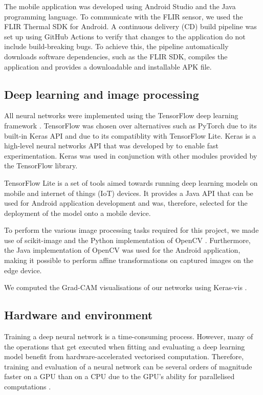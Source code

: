 \documentclass{l4proj}
\begin{document}
The mobile application was developed using Android Studio and the Java programming language. To communicate with the FLIR sensor, we used the FLIR Thermal SDK for Android. A continuous delivery (CD) build pipeline was set up using GitHub Actions to verify that changes to the application do not include build-breaking bugs. To achieve this, the pipeline automatically downloads software dependencies, such as the FLIR SDK, compiles the application and provides a downloadable and installable APK file.

\subsection{Deep learning and image processing}

All neural networks were implemented using the TensorFlow deep learning framework \citep{abadi_TensorFlow_2016}. TensorFlow was chosen over alternatives such as PyTorch due to its built-in Keras API and due to its compatiblity with TensorFlow Lite. Keras is a high-level neural networks API that was developed by \citet{chollet_keras_2015} to enable fast experimentation. Keras was used in conjunction with other modules provided by the TensorFlow library. 

TensorFlow Lite is a set of tools aimed towards running deep learning models on mobile and internet of things (IoT) devices. It provides a Java API that can be used for Android application development and was, therefore, selected for the deployment of the model onto a mobile device.

To perform the various image processing tasks required for this project, we made use of scikit-image \citep{van_der_walt_scikit-image_2014} and the Python implementation of OpenCV \citep{bradski_opencv_2000}. Furthermore, the Java implementation of OpenCV was used for the Android application, making it possible to perform affine transformations on captured images on the edge device.

We computed the Grad-CAM visualisations of our networks using Keras-vis \citep{kotikalapudi_keras-vis_2017}.

\subsection{Hardware and environment}

Training a deep neural network is a time-consuming process. However, many of the operations that get executed when fitting and evaluating a deep learning model benefit from hardware-accelerated vectorised computation. Therefore, training and evaluation of a neural network can be several orders of magnitude faster on a GPU than on a CPU due to the GPU's ability for parallelised computations \citep{shi_benchmarking_2016}. 
\end{document}
